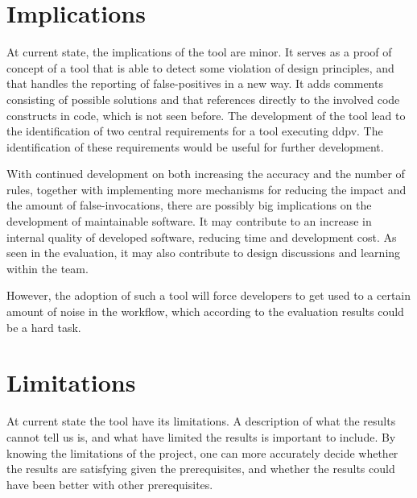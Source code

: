 \documentclass{report}
\begin{document}



\section{Implications}
At current state, the implications of the tool are minor. It serves as a proof of concept of a tool that is able to detect some violation of design principles, and that handles the reporting of false-positives in a new way. It adds comments consisting of possible solutions and that references directly to the involved code constructs in code, which is not seen before. The development of the tool lead to the identification of two central requirements for a tool executing \gls{ddpv}. The identification of these requirements would be useful for further development.

With continued development on both increasing the accuracy and the number of rules, together with implementing more mechanisms for reducing the impact and the amount of false-invocations, there are possibly big implications on the development of maintainable software. It may contribute to an increase in internal quality of developed software, reducing time and development cost. As seen in the evaluation, it may also contribute to design discussions and learning within the team.

However, the adoption of such a tool will force developers to get used to a certain amount of noise in the workflow, which according to the evaluation results could be a hard task.  



\section{Limitations}
At current state the tool have its limitations. A description of what the results cannot tell us is, and what have limited the results is important to include. By knowing the limitations of the project, one can more accurately decide whether the results are satisfying given the prerequisites, and whether the results could have been better with other prerequisites. 
\end{document}
